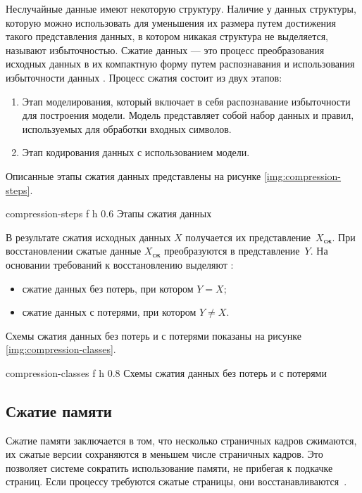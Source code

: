 Неслучайные данные имеют некоторую структуру. Наличие у данных структуры, которую можно использовать для уменьшения их размера путем достижения такого представления данных, в котором никакая структура не выделяется, называют избыточностью. Сжатие данных --- это процесс преобразования исходных данных в их компактную форму путем распознавания и использования избыточности данных \cite{compression-definition}. Процесс сжатия состоит из двух этапов:

\begin{enumerate}
	\item Этап моделирования, который включает в себя распознавание избыточности для построения модели. Модель представляет собой набор данных и правил, используемых для обработки входных символов.
	\item Этап кодирования данных с использованием модели.
\end{enumerate}

Описанные этапы сжатия данных представлены на рисунке \ref{img:compression-steps}.

    {compression-steps}
    {f}
    {h}
    {0.6\textwidth}
    {Этапы сжатия данных}

В результате сжатия исходных данных $X$ получается их представление~$X_{\text{сж}}$. При восстановлении сжатые данные $X_{\text{сж}}$ преобразуются в представление~$Y$. На основании требований к восстановлению выделяют \cite{compression-classes}:

\begin{itemize}
	\item сжатие данных без потерь, при котором $Y = X$;
	\item сжатие данных с потерями, при котором $Y \not= X$.
\end{itemize}

Схемы сжатия данных без потерь и с потерями показаны на рисунке \ref{img:compression-classes}.

    {compression-classes}
    {f}
    {h}
    {0.8\textwidth}
    {Схемы сжатия данных без потерь и с потерями}

\subsection{Сжатие памяти}

Сжатие памяти заключается в том, что несколько страничных кадров сжимаются, их сжатые версии сохраняются в меньшем числе страничных кадров. Это позволяет системе сократить использование памяти, не прибегая к подкачке страниц. Если процессу требуются сжатые страницы, они восстанавливаются~\cite{swapping}.

